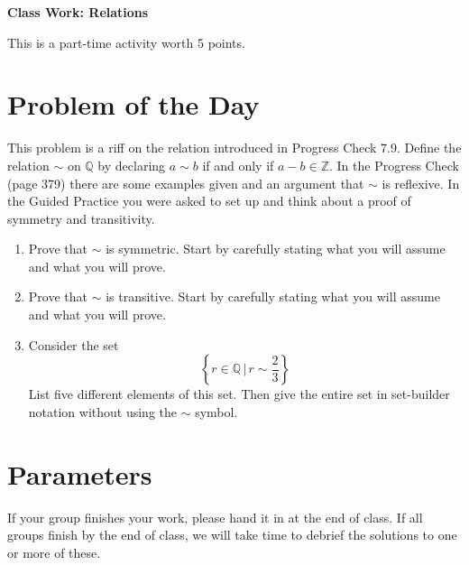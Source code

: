 \documentclass[11pt]{article}
\begin{document}
	
	\thispagestyle{empty}
	\renewcommand{\headrulewidth}{0.0pt}
	\thispagestyle{fancy}
	\lfoot{}
	\cfoot{}
	\rfoot{}	
	
	\vspace*{0in}

		\begin{center}
			\begin{large}
			\textbf{Class Work: Relations} \\
			\end{large}
			This is a part-time activity worth 5 points. 
			
		\end{center}
		

\section*{Problem of the Day}

This problem is a riff on the relation introduced in Progress Check 7.9. Define the relation $\sim$ on $\mathbb{Q}$ by declaring $a \sim b$ if and only if $a-b \in \mathbb{Z}$. In the Progress Check (page 379) there are some examples given and an argument that $\sim$ is reflexive. In the Guided Practice you were asked to set up and think about a proof of symmetry and transitivity. 

\begin{enumerate}
	\item Prove that $\sim$ is symmetric. Start by carefully stating what you will assume and what you will prove. 
	\item Prove that $\sim$ is transitive. Start by carefully stating what you will assume and what you will prove. 
	\item Consider the set 
	\[ \left\{ r \in \mathbb{Q} \, | \,  r \sim \frac{2}{3}  \right\} \]
	List five different elements of this set. Then give the entire set in set-builder notation without using the $\sim$ symbol. 
\end{enumerate}



\section*{Parameters}

If your group finishes your work, please hand it in at the end of class. If all groups finish by the end of class, we will take time to debrief the solutions to one or more of these. 
\end{document}
